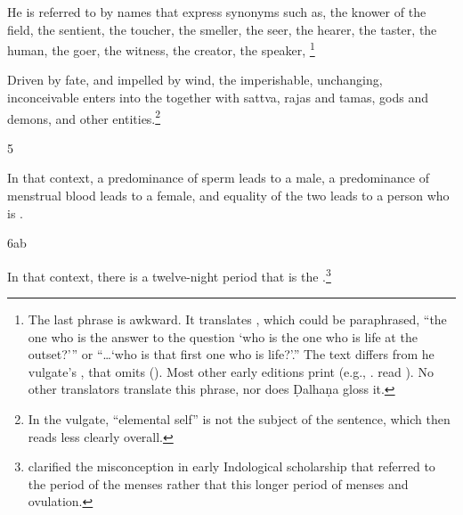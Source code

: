 \begin{translation}
He is referred to by names that express synonyms such as, the knower
of the field, the sentient, the toucher, the smeller, the seer, the
hearer, the taster, the human, the goer, the witness, the creator, the
speaker, \footnote{The last phrase is awkward.  It translates , which could be paraphrased, “the one who is the
    answer to the question `who is the one who is life at the outset?'” or
    “\ldots `who is that first one who is life?'.” The text differs from
    he vulgate's , that omits 
    (). Most other early editions print 
    (e.g., \cites[v.\,1, 320]{gupt-1835}[313]{bhat-1889}[v.\,3,
    30]{bhat-1908}[v.\,2, 635]{sarm-1895}. \citet[v.\,2, 65]{ghan-1936}
    read ). No other translators translate this
    phrase, nor does Ḍalhaṇa gloss it.} %





Driven by fate, and impelled by wind, the imperishable, unchanging,
inconceivable  enters into the
 together with sattva, rajas and tamas, gods
and demons, and other entities.\footnote{In the vulgate,
     “elemental self” is not the subject of the sentence,
    which then reads less clearly overall.}

\item [5]

In that context, a predominance of sperm leads to a male, a
predominance of menstrual blood leads to a female, and equality of the
two leads to a person who is .

\item[6ab]

In that context, there is a twelve-night period that is the
.\footnote{\citet{slaj-1995} clarified the
    misconception in early Indological scholarship that  referred
    to the period of the menses rather that this longer period of menses
    and ovulation.}


\end{translation}
